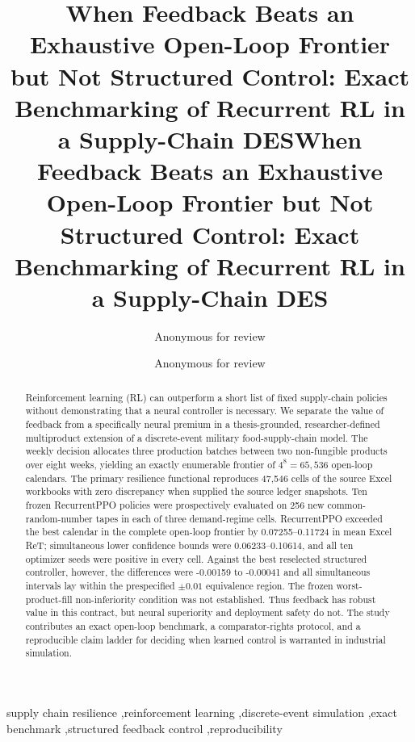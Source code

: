 \documentclass[preprint,12pt]{elsarticle}
\newif\ifelsevierclass\elsevierclasstrue
\newif\ifelsevierclass\elsevierclassfalse
\begin{document}
\ifelsevierclass
\begin{frontmatter}
\title{When Feedback Beats an Exhaustive Open-Loop Frontier but Not Structured Control: Exact Benchmarking of Recurrent RL in a Supply-Chain DES}
\author{Anonymous for review}
\begin{abstract}
Reinforcement learning (RL) can outperform a short list of fixed supply-chain policies without demonstrating that a neural controller is necessary. We separate the value of feedback from a specifically neural premium in a thesis-grounded, researcher-defined multiproduct extension of a discrete-event military food-supply-chain model. The weekly decision allocates three production batches between two non-fungible products over eight weeks, yielding an exactly enumerable frontier of $4^8=65{,}536$ open-loop calendars. The primary resilience functional reproduces 47,546 cells of the source Excel workbooks with zero discrepancy when supplied the source ledger snapshots. Ten frozen RecurrentPPO policies were prospectively evaluated on 256 new common-random-number tapes in each of three demand-regime cells. RecurrentPPO exceeded the best calendar in the complete open-loop frontier by 0.07255--0.11724 in mean Excel ReT; simultaneous lower confidence bounds were 0.06233--0.10614, and all ten optimizer seeds were positive in every cell. Against the best reselected structured controller, however, the differences were -0.00159 to -0.00041 and all simultaneous intervals lay within the prespecified $\pm0.01$ equivalence region. The frozen worst-product-fill non-inferiority condition was not established. Thus feedback has robust value in this contract, but neural superiority and deployment safety do not. The study contributes an exact open-loop benchmark, a comparator-rights protocol, and a reproducible claim ladder for deciding when learned control is warranted in industrial simulation.
\end{abstract}
\begin{keyword}
supply chain resilience \sep reinforcement learning \sep discrete-event simulation \sep exact benchmark \sep structured feedback control \sep reproducibility
\end{keyword}
\end{frontmatter}
\else
\title{When Feedback Beats an Exhaustive Open-Loop Frontier but Not Structured Control: Exact Benchmarking of Recurrent RL in a Supply-Chain DES}
\author{Anonymous for review}
\date{}
\maketitle
\end{document}

